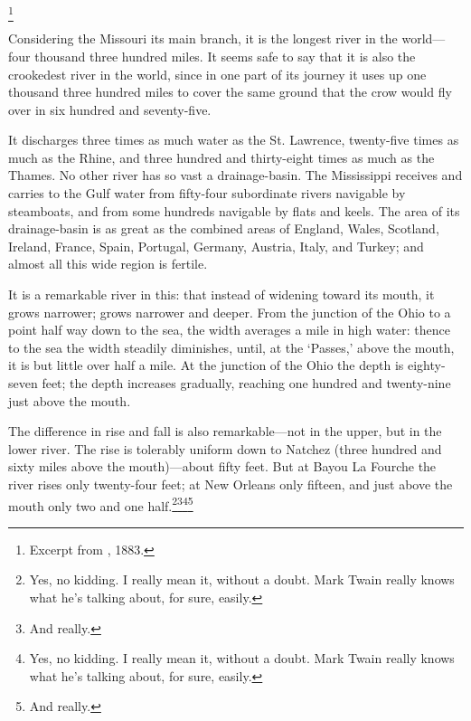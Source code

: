 \documentclass[../interior-demo.tex]{subfiles}
\begin{document}
\begin{upperpage}
\footnote{Excerpt from , 1883.}
\null
\begin{blockindent}[4,4]
\end{blockindent}
\end{upperpage}



Considering the
Missouri its main branch, it is the longest river in the world---four
thousand three hundred miles. It seems safe to say that it is also the
crookedest river in the world, since in one part of its journey it uses
up one thousand three hundred miles to cover the same ground that the
crow would fly over in six hundred and seventy-five.

It discharges three
times as much water as the St. Lawrence, twenty-five times as much
as the Rhine, and three hundred and thirty-eight times as much as the
Thames. No other river has so vast a drainage-basin. The
Mississippi receives\edit{}{,} and carries to the Gulf\edit{}{,} water from
fifty-four subordinate rivers navigable by steamboats,
and from some hundreds navigable by flats and keels.
The area of its drainage-basin is as great as the combined areas of England,
Wales, Scotland, Ireland, France, Spain, Portugal, Germany, Austria, Italy,
and Turkey; and almost all this wide region is fertile.

It is a remarkable river in this: that instead of widening toward its
mouth, it grows narrower; grows narrower and deeper. From the junction
of the Ohio to a point half way down to the sea, the width averages a
mile in high water: thence to the sea the width steadily diminishes,
until, at the `Passes,' above the mouth, it is but little over half
a mile. At the junction of the Ohio the  depth is
eighty-seven feet; the depth increases gradually, reaching one hundred
and twenty-nine just above the mouth.

The difference in rise and fall is also remarkable---not in the upper,
but in the lower river. The rise is tolerably uniform down to Natchez
(three hundred and sixty miles above the mouth)---about fifty feet.
But at Bayou La Fourche the river rises only twenty-four feet; at New
Orleans only fifteen, and just above the mouth only two and one half.\footnote{Yes, no kidding. I really mean it, without a doubt. Mark Twain really knows what he's talking about, for sure, easily.}\footnote{And really.}\footnote{Yes, no kidding. I really mean it, without a doubt. Mark Twain really knows what he's talking about, for sure, easily.}\footnote{And really.}
\end{document}
